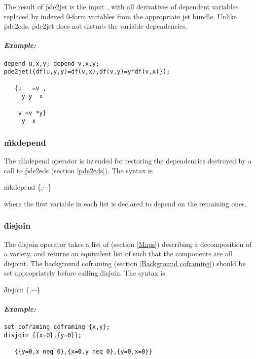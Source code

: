 The result of \f{pde2jet} is the input , with all derivatives
of dependent variables replaced by indexed 0-form variables from the
appropriate jet bundle. Unlike \f{pde2eds}, \f{pde2jet} does not disturb
the variable dependencies.

\paragraph{\textit{Example:}}
\begin{verbatim}
depend u,x,y; depend v,x,y;
pde2jet({df(u,y,y)=df(v,x),df(v,y)=y*df(v,x)});

   {u   =v ,
     y y  x

    v =v *y}
     y  x
\end{verbatim}


\subsubsection{\f{mkdepend}}
\label{mkdepend}

\hypertarget{operator:EDS_MKDEPEND}{}
The \f{mkdepend} operator is intended for restoring the dependencies
destroyed by a call to \f{pde2eds} (section \ref{pde2eds}). The syntax is
\begin{syntax}
	\f{mkdepend} \{,$\cdots$\}
\end{syntax}
where the first variable in each list is declared to depend on the
remaining ones.


\subsubsection{\f{disjoin}}
\label{disjoin}

\hypertarget{operator:DISJOIN}{}
The \f{disjoin} operator takes a list of  (section \ref{Maps})
describing a decomposition of a variety, and returns an equivalent list of
 such that the components are all disjoint. The background
coframing (section \ref{Background coframing}) should be set appropriately
before calling \f{disjoin}. The syntax is
\begin{syntax}
	\f{disjoin} \{,$\cdots$\}
\end{syntax}

\paragraph{\textit{Example:}}
\begin{verbatim}
set_coframing coframing {x,y};
disjoin {{x=0},{y=0}};

   {{y=0,x neq 0},{x=0,y neq 0},{y=0,x=0}}
\end{verbatim}

